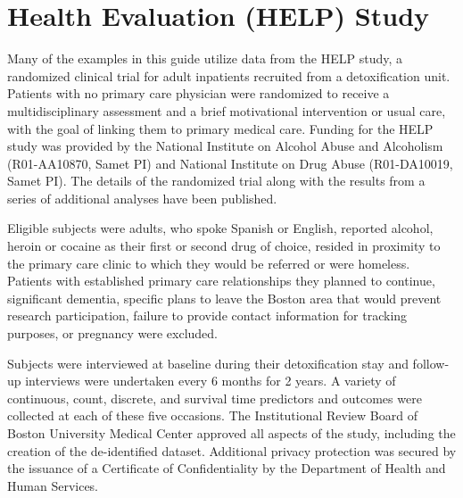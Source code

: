 \documentclass{tufte-book}\usepackage[]{graphicx}\usepackage[]{xcolor}
\begin{document}
\chapter{Health Evaluation (HELP) Study}




\label{sec:help}

%
%
Many of the examples in this guide utilize data from the HELP study,
a randomized clinical trial for adult inpatients recruited from a detoxification unit.
Patients with no primary care physician were randomized to receive a multidisciplinary assessment and a brief motivational intervention or usual care,
with the goal of linking them to primary medical care.
Funding for the HELP study was provided by the National Institute
on Alcohol Abuse and Alcoholism (R01-AA10870, Samet PI) and
National Institute on Drug Abuse (R01-DA10019, Samet PI).
The details of the
randomized trial along with the results from a series of additional analyses have been published\cite{same:lars:hort:2003,lieb:save:2002,kert:hort:frie:2003}.

Eligible subjects were
adults, who spoke Spanish or English, reported alcohol, heroin or
cocaine as their first or second drug of choice, resided in proximity
to the primary care clinic to which they would be referred or were
homeless.  Patients with established primary care relationships
they planned to continue, significant dementia, specific plans to
leave the Boston area that would prevent research participation,
failure to provide contact information for tracking purposes, or
pregnancy were excluded.

Subjects were interviewed at baseline during
their detoxification stay and follow-up interviews were undertaken
every 6 months for 2 years.  A variety of continuous, count, discrete, and survival time predictors and outcomes were collected at each of these five occasions.
The Institutional Review Board of
Boston University Medical Center approved all aspects of the study, including the creation of the de-identified dataset.  Additional
privacy protection was secured by the issuance of a Certificate of
Confidentiality by the Department of Health and Human Services.
\end{document}
